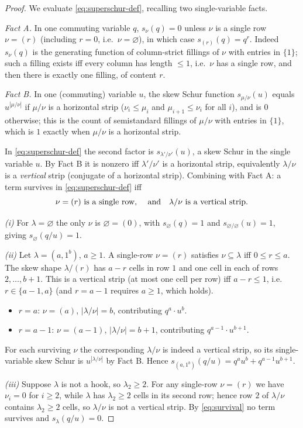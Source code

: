 \documentclass[11pt]{amsart}
\theoremstyle{definition}
\begin{document}
\begin{proof}
We evaluate \eqref{eq:superschur-def}, recalling two single-variable facts.

\emph{Fact A.} In one commuting variable $q$, $s_\nu(q)=0$ unless $\nu$ is a
single row $\nu=(r)$ (including $r=0$, i.e.\ $\nu=\varnothing$), in which case
$s_{(r)}(q)=q^{r}$. Indeed $s_\nu(q)$ is the generating function of column-strict
fillings of $\nu$ with entries in $\{1\}$; such a filling exists iff every column
has length $\le1$, i.e.\ $\nu$ has a single row, and then there is exactly one
filling, of content $r$.

\emph{Fact B.} In one (commuting) variable $u$, the skew Schur function
$s_{\mu/\nu}(u)$ equals $u^{|\mu/\nu|}$ if $\mu/\nu$ is a horizontal strip
($\nu_i\le\mu_i$ and $\mu_{i+1}\le\nu_i$ for all $i$), and is $0$ otherwise; this
is the count of semistandard fillings of $\mu/\nu$ with entries in $\{1\}$, which
is $1$ exactly when $\mu/\nu$ is a horizontal strip.

In \eqref{eq:superschur-def} the second factor is $s_{\lambda'/\nu'}(u)$, a skew
Schur in the single variable $u$. By Fact B it is nonzero iff $\lambda'/\nu'$ is a
horizontal strip, equivalently $\lambda/\nu$ is a \emph{vertical} strip (conjugate
of a horizontal strip). Combining with Fact A: a term survives in
\eqref{eq:superschur-def} iff
\begin{equation}\label{eq:survival}
\nu=(r)\ \text{is a single row, \quad and\quad } \lambda/\nu \text{ is a vertical strip.}
\end{equation}

\emph{(i)} For $\lambda=\varnothing$ the only $\nu$ is $\varnothing=(0)$, with
$s_\varnothing(q)=1$ and $s_{\varnothing/\varnothing}(u)=1$, giving
$s_\varnothing(q/u)=1$.

\emph{(ii)} Let $\lambda=(a,1^b)$, $a\ge1$. A single-row $\nu=(r)$ satisfies
$\nu\subseteq\lambda$ iff $0\le r\le a$. The skew shape $\lambda/(r)$ has
$a-r$ cells in row $1$ and one cell in each of rows $2,\dots,b+1$. This is a
vertical strip (at most one cell per row) iff $a-r\le1$, i.e.\ $r\in\{a-1,a\}$
(and $r=a-1$ requires $a\ge1$, which holds).
\begin{itemize}
\item $r=a$: $\nu=(a)$, $|\lambda/\nu|=b$, contributing
$q^{a}\cdot u^{b}$.
\item $r=a-1$: $\nu=(a-1)$, $|\lambda/\nu|=b+1$, contributing
$q^{a-1}\cdot u^{b+1}$.
\end{itemize}
For each surviving $\nu$ the corresponding $\lambda/\nu$ is indeed a vertical
strip, so its single-variable skew Schur is $u^{|\lambda/\nu|}$ by Fact B. Hence
$s_{(a,1^b)}(q/u)=q^a u^b+q^{a-1}u^{b+1}$.

\emph{(iii)} Suppose $\lambda$ is not a hook, so $\lambda_2\ge2$. For any
single-row $\nu=(r)$ we have $\nu_i=0$ for $i\ge2$, while $\lambda$ has
$\lambda_2\ge2$ cells in its second row; hence row $2$ of $\lambda/\nu$ contains
$\lambda_2\ge2$ cells, so $\lambda/\nu$ is not a vertical strip. By
\eqref{eq:survival} no term survives and $s_\lambda(q/u)=0$.
\end{proof}
\end{document}
